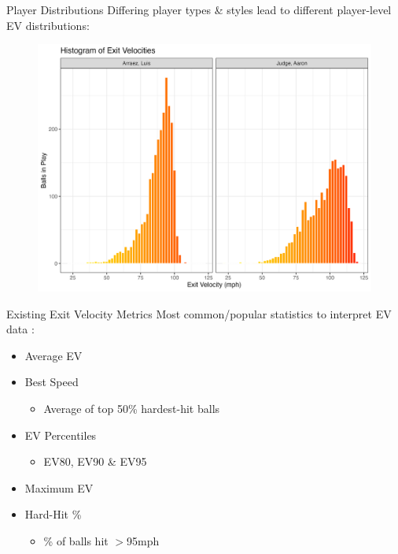 \documentclass{beamer}
\begin{document}
\begin{frame}{Player Distributions}
    Differing player types \& styles lead to different player-level EV distributions:
    \begin{figure}
        \centering
        \includegraphics[width=0.85\linewidth]{plots/playerComparison.png}
    \end{figure}
\end{frame}

\begin{frame}{Existing Exit Velocity Metrics}
Most common/popular statistics to interpret EV data \cite{andrewsEV}:
\begin{itemize}
    \item Average EV
    \item Best Speed \cite{tangoBestSpeed}
    \begin{itemize}
        \item Average of top 50\% hardest-hit balls
    \end{itemize}
    \item EV Percentiles \cite{clemensEV}
    \begin{itemize}
        \item EV80, EV90 \& EV95
    \end{itemize}
    \item Maximum EV
    \item Hard-Hit \%
    \begin{itemize}
        \item \% of balls hit $>$95mph
    \end{itemize}
\end{itemize}
\end{frame}
\end{document}
